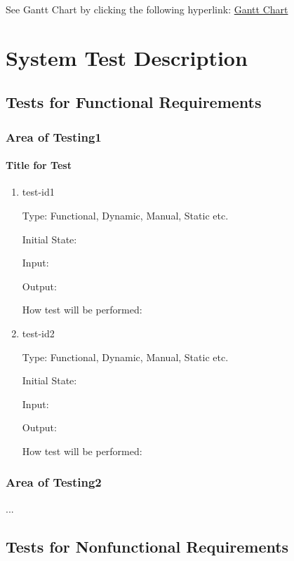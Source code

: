 \documentclass[12pt, titlepage]{article}
\begin{document}
See Gantt Chart by clicking the following hyperlink: 
\href{https://gitlab.cas.mcmaster.ca/dimitn/image_processing_app/tree/master/ProjectSchedule}{Gantt Chart}

\section{System Test Description}
	
\subsection{Tests for Functional Requirements}

\subsubsection{Area of Testing1}
		
\paragraph{Title for Test}

\begin{enumerate}

\item{test-id1\\}

Type: Functional, Dynamic, Manual, Static etc.
					
Initial State: 
					
Input: 
					
Output: 
					
How test will be performed: 
					
\item{test-id2\\}

Type: Functional, Dynamic, Manual, Static etc.
					
Initial State: 
					
Input: 
					
Output: 
					
How test will be performed: 

\end{enumerate}

\subsubsection{Area of Testing2}

...

\subsection{Tests for Nonfunctional Requirements}
\end{document}
